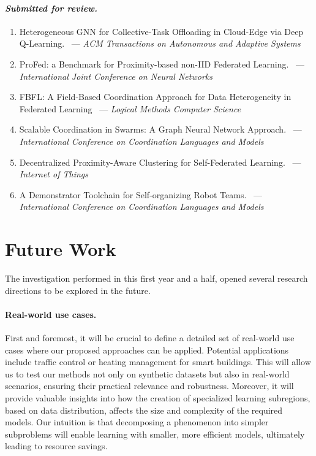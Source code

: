\documentclass[12pt]{article}
\begin{document}
 \paragraph{\emph{Submitted for review.}}
 \begin{enumerate}
	 \item Heterogeneous GNN for Collective-Task Offloading in Cloud-Edge via Deep
	  Q-Learning.~\cite{DBLP:journals/taas/FarabegoliDAV2025} --- \emph{ACM Transactions on Autonomous and Adaptive Systems}
	 \item ProFed: a Benchmark for Proximity-based non-IID Federated Learning.~\cite{DBLP:conf/ijcnn/DominiAV2025}
	  --- \emph{International Joint Conference on Neural Networks}
	 \item FBFL: A Field-Based Coordination Approach for Data Heterogeneity in 
	  Federated Learning~\cite{domini2025fbflfieldbasedcoordinationapproach} --- \emph{Logical Methods Computer Science}
	 \item Scalable Coordination in Swarms: A Graph Neural Network Approach.~\cite{DBLP:conf/coordination/VenturiniDAV2025}
	  --- \emph{International Conference on Coordination Languages and Models}
	 \item Decentralized Proximity-Aware Clustering for Self-Federated Learning.~\cite{DBLP:journals/iot/DominiAFVE2025} --- \emph{Internet of Things}
	 \item A Demonstrator Toolchain for Self-organizing Robot Teams.~\cite{DBLP:conf/coordination/AguzziNDR25} 
	  --- \emph{International Conference on Coordination Languages and Models}
 \end{enumerate}

\section{Future Work}\label{sec:future}

The investigation performed in this first year and a half, opened several research directions
 to be explored in the future.

\paragraph{Real-world use cases.}

First and foremost, it will be crucial to define a detailed set of real-world use cases where our proposed approaches can be applied. 
%
Potential applications include traffic control or heating management for smart buildings. 
%
This will allow us to test our methods not only on synthetic datasets but also in real-world scenarios, 
 ensuring their practical relevance and robustness. 
% 
Moreover, it will provide valuable insights into how the creation of specialized learning subregions, based on data distribution, 
 affects the size and complexity of the required models. 
% 
Our intuition is that decomposing a phenomenon into simpler subproblems will enable learning with smaller, more efficient models, 
 ultimately leading to resource savings.
\end{document}
